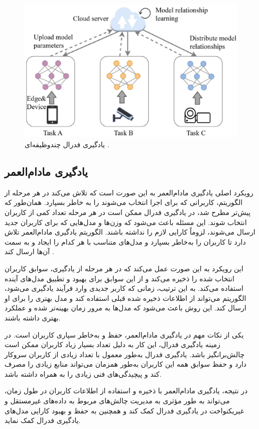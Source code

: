 \begin{figure}[t]
	\centering
	\includegraphics[scale=0.9]{images/chap3/multi_tasking.png}%
	\caption{%
		یادگیری فدرال چندوظیفه‌ای
		\cite{ma2022state}%
		.
	}
	\label{multi_tasking}
	\centering
\end{figure}


\subsection{
	یادگیری مادام‌العمر%
}
رویکرد اصلی یادگیری مادام‌العمر به این صورت است که تلاش می‌کند در هر مرحله از الگوریتم، کاربرانی که برای اجرا انتخاب می‌شوند را به خاطر بسپارد. همان‌طور که پیش‌تر مطرح شد، در یادگیری فدرال ممکن است در هر مرحله تعداد کمی از کاربران انتخاب شوند. این مسئله باعث می‌شود که وزن‌ها و مدل‌هایی که برای کاربران جدید ارسال می‌شوند، لزوماً کارایی لازم را نداشته باشند. الگوریتم یادگیری مادام‌العمر تلاش دارد تا کاربران را به‌خاطر بسپارد و مدل‌های متناسب با هر کدام را ایجاد و به سمت آن‌ها ارسال کند
\cite{shoham2019overcoming}.

این رویکرد به این صورت عمل می‌کند که در هر مرحله از یادگیری، سوابق کاربران انتخاب شده را ذخیره می‌کند و از این سوابق برای بهبود و تطبیق مدل‌های آینده استفاده می‌کند. به این ترتیب، زمانی که کاربر جدیدی وارد فرآیند یادگیری می‌شود، الگوریتم می‌تواند از اطلاعات ذخیره شده قبلی استفاده کند و مدل بهتری را برای او ارسال کند. این روش باعث می‌شود که مدل‌ها به مرور زمان بهینه‌تر شده و عملکرد بهتری داشته باشند.

یکی از نکات مهم در یادگیری مادام‌العمر، حفظ و به‌خاطر سپاری کاربران است. در زمینه یادگیری فدرال، این کار به دلیل تعداد بسیار زیاد کاربران ممکن است چالش‌برانگیز باشد. یادگیری فدرال به‌طور معمول با تعداد زیادی از کاربران سروکار دارد و حفظ سوابق همه این کاربران به‌طور همزمان می‌تواند منابع زیادی را مصرف کند و پیچیدگی‌های فنی زیادی را به همراه داشته باشد.

در نتیجه، یادگیری مادام‌العمر با ذخیره و استفاده از اطلاعات کاربران در طول زمان، می‌تواند به طور مؤثری به مدیریت چالش‌های مربوط به داده‌های غیرمستقل و غیریکنواخت در یادگیری فدرال کمک کند و همچنین به حفظ و بهبود کارایی مدل‌های یادگیری فدرال کمک نماید.




